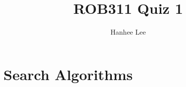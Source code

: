 \documentclass{article}
\title{ROB311 Quiz 1}
\author{Hanhee Lee}
\begin{document}
\maketitle

\tableofcontents
\newpage

\section{Search Algorithms}

\end{document}
